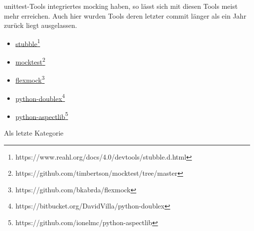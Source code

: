 unittest-Tools integriertes \gls{mock}ing haben, so lässt sich mit diesen
Tools meist mehr erreichen. Auch hier wurden Tools deren letzter \gls{commit}
länger als ein Jahr zurück liegt ausgelassen.
\begin{itemize}
    \item \href{https://www.reahl.org/docs/4.0/devtools/stubble.d.html}{stubble}\footnote{https://www.reahl.org/docs/4.0/devtools/stubble.d.html}
    \item \href{https://github.com/timbertson/mocktest/tree/master}{mocktest}\footnote{https://github.com/timbertson/mocktest/tree/master}
    \item \href{https://github.com/bkabrda/flexmock}{flexmock}\footnote{https://github.com/bkabrda/flexmock}
    \item \href{https://bitbucket.org/DavidVilla/python-doublex}{python-doublex}\footnote{https://bitbucket.org/DavidVilla/python-doublex}
    \item \href{https://github.com/ionelmc/python-aspectlib}{python-aspectlib}\footnote{https://github.com/ionelmc/python-aspectlib}
\end{itemize}
Als letzte Kategorie 
